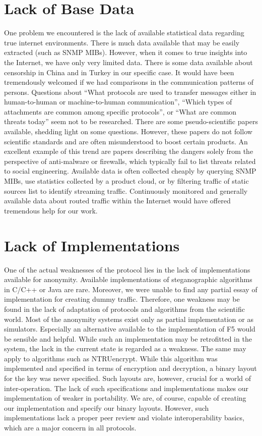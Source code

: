 \section{Lack of Base Data}

One problem we encountered is the lack of available statistical data regarding true internet environments. There is much data available that may be easily extracted (such as SNMP MIBs). However, when it comes to true insights into the Internet, we have only very limited data. There is some data available about censorship in China and in Turkey in our specific case. It would have been tremendously welcomed if we had comparisons in the communication patterns of persons. Questions about ``What protocols are used to transfer messages either in human-to-human or machine-to-human communication'', ``Which types of attachments are common among specific protocols'', or ``What are common threats today'' seem not to be researched. There are some pseudo-scientific papers available, shedding light on some questions. However, these papers do not follow scientific standards and are often misunderstood to boost certain products. An excellent example of this trend are papers describing the dangers solely from the perspective of anti-malware or firewalls, which typically fail to list threats related to social engineering. Available data is often collected cheaply by querying SNMP MIBs, use statistics collected by a product cloud, or by filtering traffic of static sources list to identify streaming traffic. Continuously monitored and generally available data about routed traffic within the Internet would have offered tremendous help for our work.

\section{Lack of Implementations}
One of the actual weaknesses of the protocol lies in the lack of implementations available for anonymity. Available implementations of steganographic algorithms in C/C++ or Java are rare. Moreover, we were unable to find any partial essay of implementation for creating dummy traffic. Therefore, one weakness may be found in the lack of adaptation of protocols and algorithms from the scientific world. Most of the anonymity systems exist only as partial implementation or as simulators. Especially an alternative available to the implementation of F5 would be sensible and helpful. While such an implementation may be retrofitted in the system, the lack in the current state is regarded as a weakness. The same may apply to algorithms such as NTRUencrypt. While this algorithm was implemented and specified in terms of encryption and decryption, a binary layout for the key was never specified. Such layouts are, however, crucial for a world of inter-operation. The lack of such specifications and implementations makes our implementation of \MessageVortex{} weaker in portability. We are, of course, capable of creating our implementation and specify our binary layouts. However, such implementations lack a proper peer review and violate interoperability basics, which are a major concern in all protocols. 

